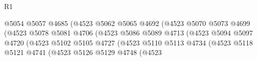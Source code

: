 \begin{lexlean}{R1}
\begin{coremodule}
                                                  @5054
                                                  @5057
                                                  @4685
                                                  (@4523
                                                    @5062
                                                    @5065
                                                    @4692
                                                    (@4523
                                                      @5070
                                                      @5073
                                                      @4699
                                                      (@4523
                                                        @5078
                                                        @5081
                                                        @4706
                                                        (@4523
                                                          @5086
                                                          @5089
                                                          @4713
                                                          (@4523
                                                            @5094
                                                            @5097
                                                            @4720
                                                            (@4523
                                                              @5102
                                                              @5105
                                                              @4727
                                                              (@4523
                                                                @5110
                                                                @5113
                                                                @4734
                                                                (@4523
                                                                  @5118
                                                                  @5121
                                                                  @4741
                                                                  (@4523
                                                                    @5126
                                                                    @5129
                                                                    @4748
                                                                    (@4523

\end{coremodule}
\end{lexlean}
